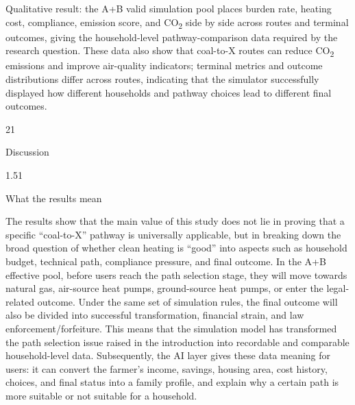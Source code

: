 \documentclass[stu,12pt,floatsintext,donotrepeattitle]{apa7}
\makeatletter
\newcommand{\Sanhao}{\fontsize{16pt}{20pt}\selectfont}
\newcommand{\Sihao}{\fontsize{14pt}{18pt}\selectfont}
\renewcommand{\section}{\@startsection{section}{1}{\z@}%
  {2\baselineskip}{1\baselineskip}%
  {\normalfont\Sanhao\bfseries\raggedright}}
\renewcommand{\subsection}{\@startsection{subsection}{2}{\z@}%
  {1.5\baselineskip}{1\baselineskip}%
  {\normalfont\Sihao\bfseries\raggedright}}
\makeatother
\begin{document}
\begin{table}[H]
\centering
\scriptsize
\setlength{\tabcolsep}{2pt}
\caption{Simulated Metrics by Terminal Outcome}
\label{tab:metrics-by-terminal}
\end{table}

Qualitative result: the A+B valid simulation pool places burden rate, heating cost, compliance, emission score, and CO\textsubscript{2} side by side across routes and terminal outcomes, giving the household-level pathway-comparison data required by the research question. These data also show that coal-to-X routes can reduce CO\textsubscript{2} emissions and improve air-quality indicators; terminal metrics and outcome distributions differ across routes, indicating that the simulator successfully displayed how different households and pathway choices lead to different final outcomes.

\section{Discussion}

\subsection{What the results mean}

The results show that the main value of this study does not lie in proving that a specific ``coal-to-X'' pathway is universally applicable, but in breaking down the broad question of whether clean heating is ``good'' into aspects such as household budget, technical path, compliance pressure, and final outcome. In the A+B effective pool, before users reach the path selection stage, they will move towards natural gas, air-source heat pumps, ground-source heat pumps, or enter the legal-related outcome. Under the same set of simulation rules, the final outcome will also be divided into successful transformation, financial strain, and law enforcement/forfeiture. This means that the simulation model has transformed the path selection issue raised in the introduction into recordable and comparable household-level data. Subsequently, the AI layer gives these data meaning for users: it can convert the farmer's income, savings, housing area, cost history, choices, and final status into a family profile, and explain why a certain path is more suitable or not suitable for a household.
\end{document}
